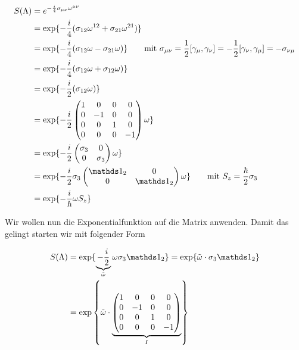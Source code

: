 \begin{align}
  \label{eq:39}
   S(\Lambda) &= e^{-\frac{i}{4}\sigma_{\mu\nu}\omega^{\mu\nu}} \notag \\
&= \exp\{-\frac{i}{4}(\sigma_{12}\omega^{12}+\sigma_{21}\omega^{21})\}\notag \\
&= \exp\{-\frac{i}{4}(\sigma_{12}\omega-\sigma_{21}\omega)\}\notag \qquad \text{mit } \sigma_{\mu\nu}=\frac{1}{2}[\gamma_\mu,\gamma_\nu]=- \frac{1}{2}[\gamma_\nu,\gamma_\mu] = -\sigma_{\nu\mu} \\
&= \exp\{-\frac{i}{4}(\sigma_{12}\omega+\sigma_{12}\omega)\}\notag \\
&= \exp\{-\frac{i}{2}(\sigma_{12}\omega)\}\notag \\
&= \exp\{-\frac{i}{2}  \begin{pmatrix}1&0&0&0\\ 0&-1&0&0\\0&0&1&0\\0&0&0&-1 \end{pmatrix}  \omega\}\notag \\
&= \exp\{-\frac{i}{2}  \begin{pmatrix}\sigma_3&0\\ 0&\sigma_3 \end{pmatrix}  \omega\}\notag \\
&= \exp\{-\frac{i}{2} \sigma_3 \begin{pmatrix}\mathds 1_2&0\\ 0&\mathds 1_2 \end{pmatrix}  \omega\}\qquad \text{mit }S_z = \frac{\hbar}{2}\sigma_3\notag \\
&= \exp\{-\frac{i}{\hbar}\omega S_z \}
\end{align}

Wir wollen nun die Exponentialfunktion auf die Matrix anwenden. Damit das gelingt starten wir mit folgender Form

\begin{align}
  \label{eq:40}
   S(\Lambda) &= \exp\{\underbr{ -\frac{i}{2}}_{\tilde\omega} \omega \sigma_3 \mathds 1_2 \} = \exp\{ \tilde\omega \cdot \sigma_3\mathds 1_2 \} \\
 &=\exp\left\{ \tilde\omega \cdot \underbr{ \begin{pmatrix}1&0&0&0\\0&-1&0&0\\ 0&0&1&0\\0&0&0&-1 \end{pmatrix} }_{I} \right\} 
\end{align}

